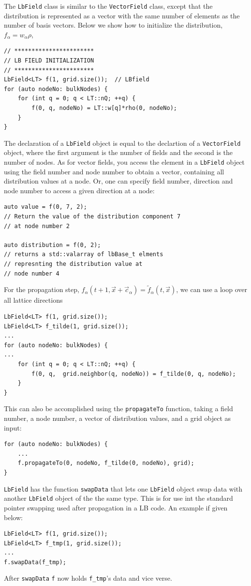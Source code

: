 \documentclass[11pt,a4paper]{report}
\begin{document}
The \texttt{LbField} class is similar to the \texttt{VectorField} class, except that the distribution is represented as a vector with the same number of elements as the number of basis vectors. Below we show how to initialize the distribution, $f_\alpha = w_\alpha\rho$,
\begin{verbatim}
// ***********************
// LB FIELD INITIALIZATION
// ***********************
LbField<LT> f(1, grid.size());  // LBfield
for (auto nodeNo: bulkNodes) {
    for (int q = 0; q < LT::nQ; ++q) {
        f(0, q, nodeNo) = LT::w[q]*rho(0, nodeNo);
    }
}
\end{verbatim} 
The declaration of a \texttt{LbField} object is equal to the declartion of a \texttt{VectorField} object, where the first argument is the number of fields and the second is the number of nodes.
As for vector fields, you access the element in a \texttt{LbField} object using the field number and node number to obtain a vector, containing all distribution values at a node. Or, one can specify field number, direction and node number to access a given direction at a node:
\begin{verbatim}
auto value = f(0, 7, 2);
// Return the value of the distribution component 7 
// at node number 2

auto distribution = f(0, 2);
// returns a std::valarray of lbBase_t elments 
// represnting the distribution value at 
// node number 4
\end{verbatim}
For the propagation step, $f_\alpha(t+1, \vec{x} + \vec{c}_\alpha) = \tilde{f}_\alpha(t,\vec{x})$, we can use a loop over all lattice directions
\begin{verbatim}
LbField<LT> f(1, grid.size());
LbField<LT> f_tilde(1, grid.size());
...
for (auto nodeNo: bulkNodes) {
...
    for (int q = 0; q < LT::nQ; ++q) {  
        f(0, q,  grid.neighbor(q, nodeNo)) = f_tilde(0, q, nodeNo);
    }
}
\end{verbatim}
This can also be accomplished using the \texttt{propagateTo} function, taking a field number, a node number, a vector of distribution values, and a grid object as input:
\begin{verbatim}
for (auto nodeNo: bulkNodes) {
    ...
    f.propagateTo(0, nodeNo, f_tilde(0, nodeNo), grid);
}
\end{verbatim}
\texttt{LbField} has the function \texttt{swapData} that lets one \texttt{LbField} object swap data with another \texttt{LbField} object of the the same type. This is for use int the standard pointer swapping used after propagation in a LB code. An example if given below:
\begin{verbatim}
LbField<LT> f(1, grid.size());
LbField<LT> f_tmp(1, grid.size());
...
f.swapData(f_tmp);
\end{verbatim}
After \texttt{swapData} \texttt{f} now holds \texttt{f\_tmp}'s data and vice verse.
\end{document}
